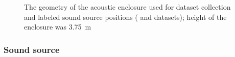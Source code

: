 \documentclass[applsci,article,submit,moreauthors,pdftex]{Definitions/mdpi}
\begin{document}
\begin{figure}[h!]
	\centering
	\caption{The geometry of the acoustic enclosure used for \realworld{} dataset collection and labeled sound source positions ( and  datasets); height of the enclosure was \SI{3.75}{\m}}\label{fig:room_src_pos}
\end{figure}

\subsubsection{Sound source}
\end{document}
